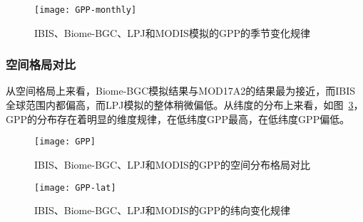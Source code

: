 \begin{figure}[!htbp]
    \centering
    \texttt{[image: GPP-monthly]}
    \caption{IBIS、Biome-BGC、LPJ和MODIS模拟的GPP的季节变化规律}
    \label{fig:GPP-monthly}
\end{figure}


\subsubsection{空间格局对比}
从空间格局上来看，Biome-BGC模拟结果与MOD17A2的结果最为接近，而IBIS全球范围内都偏高，而LPJ模拟的整体稍微偏低。从纬度的分布上来看，如图~\ref{fig:GPP-lat}，GPP的分布存在着明显的维度规律，在低纬度GPP最高，在低纬度GPP偏低。

\begin{figure}[!htbp]
    \centering
    \texttt{[image: GPP]}
    \caption{IBIS、Biome-BGC、LPJ和MODIS的GPP的空间分布格局对比}
    \label{fig:GPP}
\end{figure}

\begin{figure}[!htbp]
    \centering
    \texttt{[image: GPP-lat]}
    \caption{IBIS、Biome-BGC、LPJ和MODIS的GPP的纬向变化规律}
    \label{fig:GPP-lat}
\end{figure}